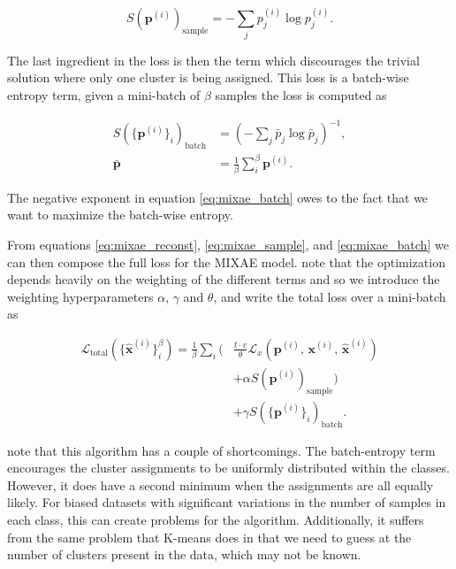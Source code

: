 \begin{equation}\label{eq:mixae_sample}
S(\mathbf{p}^{(i)})_{\text{sample}} = -\sum_j p_j^{(i)} \log p_j^{(i)}. 
\end{equation}

\noindent The last ingredient in the loss is then the term which discourages the trivial solution where only one cluster is being assigned. This loss is a batch-wise entropy term, given a mini-batch of $\beta$ samples the loss is computed as 

\begin{equation}\label{eq:mixae_batch}
\begin{split}
S(\{\mathbf{p}^{(i)}\}_i)_{\text{batch}}&= \left(-\sum_j \bar{p}_j \log \bar{p}_j \right)^{-1},\\
\bar{\mathbf{p}} &= \frac{1}{\beta} \sum_i ^\beta \mathbf{p}^{(i)} .
\end{split}
\end{equation}

\noindent The negative exponent in equation \ref{eq:mixae_batch} owes to the fact that we want to maximize the batch-wise entropy.

From equations \ref{eq:mixae_reconst}, \ref{eq:mixae_sample}, and \ref{eq:mixae_batch} we can then compose the full loss for the MIXAE model. \cite{Zhang} note that the optimization depends heavily on the weighting of the different terms and so we introduce the weighting hyperparameters $\alpha$, $\gamma$ and $\theta$, and write the total loss over a mini-batch as 

\begin{equation}\label{eq:mixae_loss}
\begin{split}
\mathcal{L}_{\text{total}}(\{\hat{\mathbf{x}}^{(i)}\}^\beta_i) = \frac{1}{\beta}\sum_i \Big( &\frac{t\cdot v}{\theta} \mathcal{L}_x(\mathbf{p}^{(i)},\,\mathbf{x}^{(i)},\, \hat{\mathbf{x}}^{(i)} ) \\
&+ \alpha S(\mathbf{p}^{(i)})_{\text{sample}} \Big) \\
&+\gamma S(\{\mathbf{p}^{(i)}\}_i)_{\text{batch}}.
\end{split}
\end{equation}

\noindent \cite{Zhang} note that this algorithm has a couple of shortcomings. The batch-entropy term encourages the cluster assignments to be uniformly distributed within the classes. However, it does have a second minimum when the assignments are all equally likely. For biased datasets with significant variations in the number of samples in each class, this can create problems for the algorithm. Additionally, it suffers from the same problem that K-means does in that we need to guess at the number of clusters present in the data, which may not be known. 
